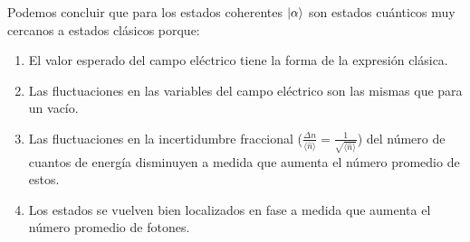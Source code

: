     Podemos concluir que para los estados coherentes $\ket{\alpha}$ son estados cuánticos muy cercanos a estados clásicos porque:

    \begin{enumerate}
        \item El valor esperado del campo eléctrico tiene la forma de la expresión clásica.

        \item Las fluctuaciones en las variables del campo eléctrico son las mismas que para un vacío.

        \item Las fluctuaciones en la incertidumbre fraccional ($\frac{\Delta n}{\langle \hat{n} \rangle} = \frac{1}{\sqrt{\langle \hat{n}\rangle}}$) del número de cuantos de energía disminuyen a medida que aumenta el número promedio de estos.

        \item Los estados se vuelven bien localizados en fase a medida que aumenta el número promedio de fotones.
    \end{enumerate}
